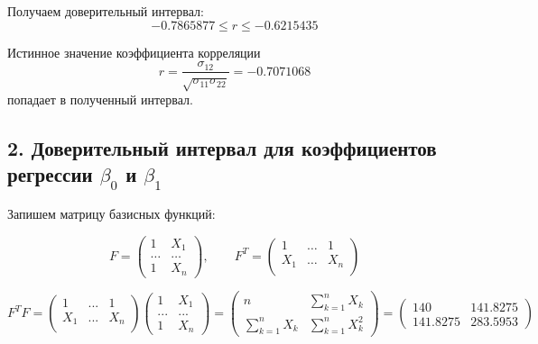 \documentclass[14pt,a4paper]{scrartcl}
\begin{document}
Получаем доверительный интервал:
\begin{equation*}
	-0.7865877 \leq r \leq -0.6215435
\end{equation*}

Истинное значение коэффициента корреляции
\begin{equation*}
	r = \frac{\sigma_{12}}{\sqrt{\sigma_{11}\sigma_{22}}} = -0.7071068
\end{equation*}
попадает в полученный интервал.

\subsection*{2. Доверительный интервал для коэффициентов регрессии $\beta_0$ и $\beta_1$}

Запишем матрицу базисных функций:

\begin{equation*}
	F=
	\begin{pmatrix}
		1& X_1 \\
		\ldots &\ldots\\
		1 & X_n
	\end{pmatrix},
	\qquad
	F^T=
	\begin{pmatrix}
		1& \ldots&1 \\
		X_1 &\ldots&X_n\\
	\end{pmatrix}
\end{equation*}

\begin{equation*}
	F^TF=\begin{pmatrix}
	1& ...&1 \\
	X_1 &...&X_n\\
	
	
	
	\end{pmatrix}\begin{pmatrix}
	1& X_1 \\
	... &...\\
	
	1 & X_n
	
	
	\end{pmatrix}=\begin{pmatrix}
	n& \sum\limits_{k=1}^nX_k \\
	\sum\limits_{k=1}^nX_k & \sum\limits_{k=1}^nX_k^2
	
	
	
	\end{pmatrix}=
	\begin{pmatrix}
	140& 141.8275 \\
	141.8275 & 283.5953
	
	
	
	\end{pmatrix}
\end{equation*}
\end{document}

